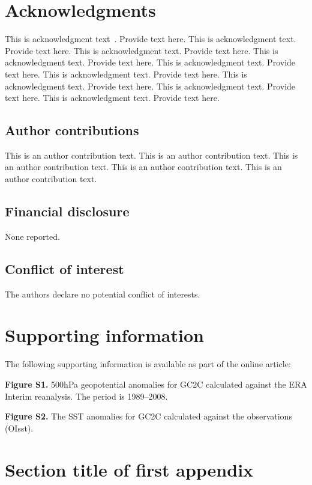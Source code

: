 \documentclass[APA,STIX1COL]{WileyNJD-v2}
\begin{document}

\section*{Acknowledgments}
This is acknowledgment text~\cite{Elbaum2002}. Provide text here. This is acknowledgment text. Provide text here. This is acknowledgment text. Provide text here. This is acknowledgment text. Provide text here. This is acknowledgment text. Provide text here. This is acknowledgment text. Provide text here. This is acknowledgment text. Provide text here. This is acknowledgment text. Provide text here. This is acknowledgment text. Provide text here. 

\subsection*{Author contributions}

This is an author contribution text. This is an author contribution text. This is an author contribution text. This is an author contribution text. This is an author contribution text. 

\subsection*{Financial disclosure}

None reported.

\subsection*{Conflict of interest}

The authors declare no potential conflict of interests.


\section*{Supporting information}

The following supporting information is available as part of the online article:

\noindent
\textbf{Figure S1.}
{500{\uns}hPa geopotential anomalies for GC2C calculated against the ERA Interim reanalysis. The period is 1989--2008.}

\noindent
\textbf{Figure S2.}
{The SST anomalies for GC2C calculated against the observations (OIsst).}


\appendix

\section{Section title of first appendix\label{app1}}
\end{document}

